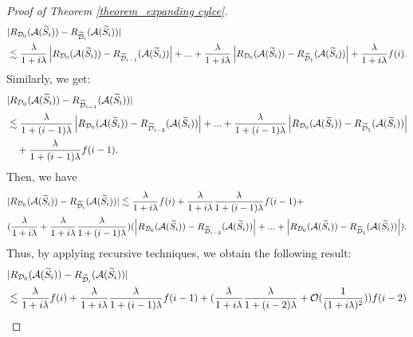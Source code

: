 \begin{proof}[Proof of Theorem \ref{theorem_expanding cylce}]
\begin{align}
    &|R_{\mathcal{D}_0}(\mathcal{A}(\widetilde{S}_i))-R_{\widetilde{\mathcal{D}}_i}(\mathcal{A}(\widetilde{S}_i))|\notag \\
    &\lesssim\frac{\lambda}{1+i \lambda}\left|R_{\mathcal{D}_0}(\mathcal{A}(\widetilde{S}_i))-R_{\widetilde{\mathcal{D}}_{i-1}}(\mathcal{A}(\widetilde{S}_i))\right|+...+\frac{\lambda}{1+i \lambda}\left|R_{\mathcal{D}_0}(\mathcal{A}(\widetilde{S}_i))-R_{\widetilde{\mathcal{D}}_{1}}(\mathcal{A}(\widetilde{S}_i))\right|+\frac{\lambda}{1+i \lambda}f(i)\notag.
\end{align}
Similarly, we get:
\begin{align}
    &|R_{\mathcal{D}_0}(\mathcal{A}(\widetilde{S}_i))-R_{\widetilde{\mathcal{D}}_{i-1}}(\mathcal{A}(\widetilde{S}_i))|\notag \\
    &\lesssim\frac{\lambda}{1+(i-1) \lambda}\left|R_{\mathcal{D}_0}(\mathcal{A}(\widetilde{S}_i))-R_{\widetilde{\mathcal{D}}_{i-2}}(\mathcal{A}(\widetilde{S}_i))\right|+...+\frac{\lambda}{1+(i-1) \lambda}\left|R_{\mathcal{D}_0}(\mathcal{A}(\widetilde{S}_i))-R_{\widetilde{\mathcal{D}}_{1}}(\mathcal{A}(\widetilde{S}_i))\right|\notag\\
    & \quad+\frac{\lambda}{1+(i-1) \lambda}f(i-1) \notag.
\end{align}
Then, we have
\begin{align}
 &|R_{\mathcal{D}_0}(\mathcal{A}(\widetilde{S}_i))-R_{\widetilde{\mathcal{D}}_i}(\mathcal{A}(\widetilde{S}_i))|\lesssim \frac{\lambda}{1+i \lambda} f(i)+\frac{\lambda}{1+i \lambda}\frac{\lambda}{1+(i-1) \lambda} f(i-1)+\notag \\
 &(\frac{\lambda}{1+i \lambda}+\frac{\lambda}{1+i \lambda} \frac{\lambda}{1+(i-1) \lambda})(\left|R_{\mathcal{D}_0}(\mathcal{A}(\widetilde{S}_i))-R_{\widetilde{\mathcal{D}}_{i-2}}(\mathcal{A}(\widetilde{S}_i))\right|+...+\left|R_{\mathcal{D}_0}(\mathcal{A}(\widetilde{S}_i))-R_{\widetilde{\mathcal{D}}_{1}}(\mathcal{A}(\widetilde{S}_i))\right|).
\end{align}
Thus, by applying recursive techniques, we obtain the following result:
\begin{align}
 &|R_{\mathcal{D}_0}(\mathcal{A}(\widetilde{S}_i))-R_{\widetilde{\mathcal{D}}_i}(\mathcal{A}(\widetilde{S}_i))|\notag \\
 &\lesssim \frac{\lambda}{1+i \lambda} f(i)+\frac{\lambda}{1+i \lambda}\frac{\lambda}{1+(i-1) \lambda} f(i-1)+
 (\frac{\lambda}{1+i \lambda}\frac{\lambda}{1+(i-2) \lambda}+\mathcal{O}(\frac{1}{(1+i\lambda)^2}))f(i-2)\notag \\

\end{align}
\end{proof}
